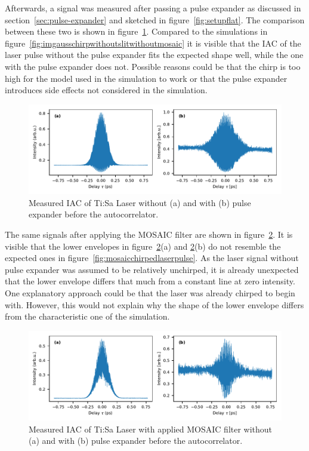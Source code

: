 Afterwards, a signal was measured after passing a pulse expander as discussed in section~\ref{sec:pulse-expander} and sketched in figure~\ref{fig:setupflat}.
The comparison between these two is shown in figure~\ref{fig:measuredchirpedlaserpulsebeforemosaic}.
Compared to the simulations in figure~\ref{fig:imgausschirpwithoutslitwithoutmosaic} it is visible that the \ac{IAC} of the laser pulse without the pulse expander fits the expected shape well, while the one with the pulse expander does not.
Possible reasons could be that the chirp is too high for the model used in the simulation to work or that the pulse expander introduces side effects not considered in the simulation.

\begin{figure}[H]
	\centering
	\includegraphics[width=\linewidth]{figures/chirp/plots/measured_chirped_laser_pulse_before_MOSAIC}
	\caption{Measured IAC of Ti:Sa Laser without (a) and with (b) pulse expander before the autocorrelator.}
	\label{fig:measuredchirpedlaserpulsebeforemosaic}
\end{figure}

The same signals after applying the \ac{MOSAIC} filter are shown in figure~\ref{fig:measuredchirpedlaserpulseaftermosaic}.
It is visible that the lower envelopes in figure~\ref{fig:measuredchirpedlaserpulseaftermosaic}(a) and \ref{fig:measuredchirpedlaserpulseaftermosaic}(b) do not resemble the expected ones in figure~\ref{fig:mosaicchirpedlaserpulse}.
As the laser signal without pulse expander was assumed to be relatively unchirped, it is already unexpected that the lower envelope differs that much from a constant line at zero intensity.
One explanatory approach could be that the laser was already chirped to begin with. However, this would not explain why the shape of the lower envelope differs from the characteristic one of the simulation.

\begin{figure}[H]
	\centering
	\includegraphics[width=\linewidth]{figures/chirp/plots/measured_chirped_laser_pulse_after_MOSAIC}
	\caption{Measured IAC of Ti:Sa Laser with applied MOSAIC filter without (a) and with (b) pulse expander before the autocorrelator.}
	\label{fig:measuredchirpedlaserpulseaftermosaic}
\end{figure}

